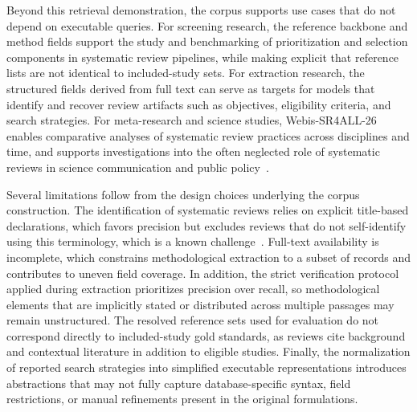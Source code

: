 Beyond this retrieval demonstration, the corpus supports use cases that do not depend on executable queries. For screening research, the reference backbone and method fields support the study and benchmarking of prioritization and selection components in systematic review pipelines, while making explicit that reference lists are not identical to included-study sets. For extraction research, the structured fields derived from full text can serve as targets for models that identify and recover review artifacts such as objectives, eligibility criteria, and search strategies. For meta-research and science studies, Webis-SR4ALL-26 enables comparative analyses of systematic review practices across disciplines and time, and supports investigations into the often neglected role of systematic reviews in science communication and public policy~\cite{blumel:2020, mcmahan:2021, schniedermann:2022, simons:2021}.

Several limitations follow from the design choices underlying the corpus construction. The identification of systematic reviews relies on explicit title-based declarations, which favors precision but excludes reviews that do not self-identify using this terminology, which is a known challenge~\cite{moher:2007}. Full-text availability is incomplete, which constrains methodological extraction to a subset of records and contributes to uneven field coverage. In addition, the strict verification protocol applied during extraction prioritizes precision over recall, so methodological elements that are implicitly stated or distributed across multiple passages may remain unstructured. The resolved reference sets used for evaluation do not correspond directly to included-study gold standards, as reviews cite background and contextual literature in addition to eligible studies. Finally, the normalization of reported search strategies into simplified executable representations introduces abstractions that may not fully capture database-specific syntax, field restrictions, or manual refinements present in the original formulations.

